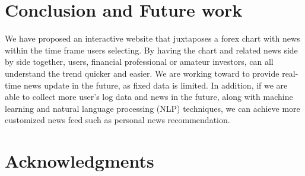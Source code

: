 \documentclass[sigconf]{acmart}
\begin{document}
\section{Conclusion and Future work}
We have proposed an interactive website that juxtaposes a forex chart with news within the time frame users selecting. By having the chart and related news side by side together, users, financial professional or amateur investors, can all understand the trend quicker and easier. We are working toward to provide real-time news update in the future, as fixed data is limited. In addition, if we are able to collect more user's log data and news in the future, along with machine learning and natural language processing (NLP) techniques, we can achieve more customized news feed such as personal news recommendation.  

\section{Acknowledgments}





\end{document}
